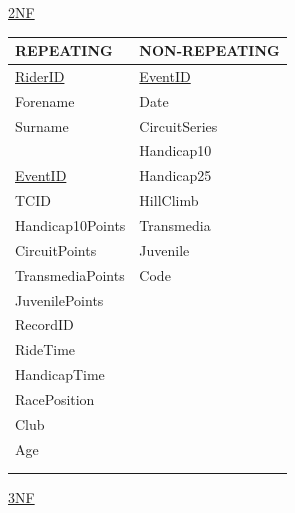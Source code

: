 \underline{2NF}

\begin{tabular}{|l|l|}
\hline
REPEATING           & NON-REPEATING \\ \hline
\underline{RiderID} & \underline{EventID} \\ \hline
Forename            & Date \\ \hline
Surname             & CircuitSeries \\ \hline
                    & Handicap10 \\ \hline
\underline{EventID} & Handicap25 \\ \hline 
TCID                & HillClimb \\ \hline 
Handicap10Points    & Transmedia \\ \hline
CircuitPoints       & Juvenile \\ \hline 
TransmediaPoints    & Code \\ \hline
JuvenilePoints      & \\ \hline
RecordID            & \\ \hline
RideTime            & \\ \hline
HandicapTime        & \\ \hline
RacePosition        & \\ \hline
Club                & \\ \hline
Age                 & \\ \hline
                    & \\ \hline
                    & \\ \hline

\end{tabular}

\underline{3NF}

